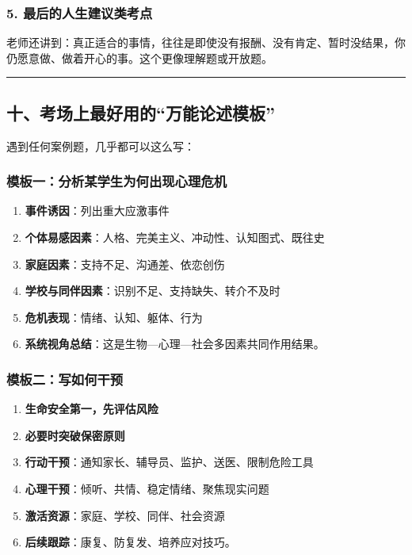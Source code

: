 \documentclass[
  a4paper,
]{ctexart}
\providecommand{\tightlist}{%
  \setlength{\itemsep}{0pt}\setlength{\parskip}{0pt}}
\begin{document}
\subsubsection{5.
最后的人生建议类考点}\label{ux6700ux540eux7684ux4ebaux751fux5efaux8baeux7c7bux8003ux70b9}

老师还讲到：真正适合的事情，往往是即使没有报酬、没有肯定、暂时没结果，你仍愿意做、做着开心的事。这个更像理解题或开放题。

\begin{center}\rule{0.5\linewidth}{0.5pt}\end{center}

\subsection{十、考场上最好用的``万能论述模板''}\label{ux5341ux8003ux573aux4e0aux6700ux597dux7528ux7684ux4e07ux80fdux8bbaux8ff0ux6a21ux677f}

遇到任何案例题，几乎都可以这么写：

\subsubsection{模板一：分析某学生为何出现心理危机}\label{ux6a21ux677fux4e00ux5206ux6790ux67d0ux5b66ux751fux4e3aux4f55ux51faux73b0ux5fc3ux7406ux5371ux673a}

\begin{enumerate}
\def\labelenumi{\arabic{enumi}.}
\tightlist
\item
  \textbf{事件诱因}：列出重大应激事件
\item
  \textbf{个体易感因素}：人格、完美主义、冲动性、认知图式、既往史
\item
  \textbf{家庭因素}：支持不足、沟通差、依恋创伤
\item
  \textbf{学校与同伴因素}：识别不足、支持缺失、转介不及时
\item
  \textbf{危机表现}：情绪、认知、躯体、行为
\item
  \textbf{系统视角总结}：这是生物---心理---社会多因素共同作用结果。
\end{enumerate}

\subsubsection{模板二：写如何干预}\label{ux6a21ux677fux4e8cux5199ux5982ux4f55ux5e72ux9884}

\begin{enumerate}
\def\labelenumi{\arabic{enumi}.}
\tightlist
\item
  \textbf{生命安全第一，先评估风险}
\item
  \textbf{必要时突破保密原则}
\item
  \textbf{行动干预}：通知家长、辅导员、监护、送医、限制危险工具
\item
  \textbf{心理干预}：倾听、共情、稳定情绪、聚焦现实问题
\item
  \textbf{激活资源}：家庭、学校、同伴、社会资源
\item
  \textbf{后续跟踪}：康复、防复发、培养应对技巧。
\end{enumerate}
\end{document}
